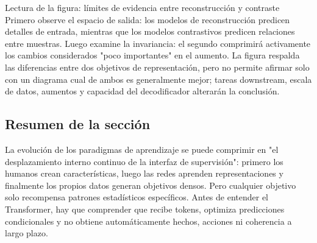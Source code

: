 
\begin{knowledgebox}{Lectura de la figura: límites de evidencia entre reconstrucción y contraste}
Primero observe el espacio de salida: los modelos de reconstrucción predicen detalles de entrada, mientras que los modelos contrastivos predicen relaciones entre muestras. Luego examine la invariancia: el segundo comprimirá activamente los cambios considerados "poco importantes" en el aumento. La figura respalda las diferencias entre dos objetivos de representación, pero no permite afirmar solo con un diagrama cual de ambos es generalmente mejor; tareas downstream, escala de datos, aumentos y capacidad del decodificador alterarán la conclusión.
\end{knowledgebox}

\subsection{Resumen de la sección}

La evolución de los paradigmas de aprendizaje se puede comprimir en "el desplazamiento interno continuo de la interfaz de supervisión": primero los humanos crean características, luego las redes aprenden representaciones y finalmente los propios datos generan objetivos densos. Pero cualquier objetivo solo recompensa patrones estadísticos específicos. Antes de entender el Transformer, hay que comprender que recibe tokens, optimiza predicciones condicionales y no obtiene automáticamente hechos, acciones ni coherencia a largo plazo.



